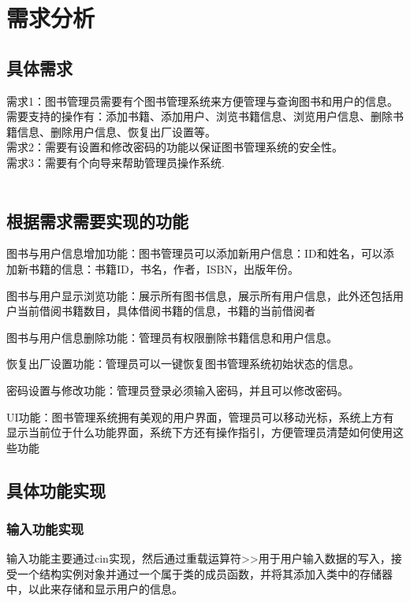 \documentclass{article}
\begin{document}
\tableofcontents
\newpage

\section{需求分析}

\subsection{具体需求}
\noindent
需求1：图书管理员需要有个图书管理系统来方便管理与查询图书和用户的信息。需要支持的操作有：添加书籍、添加用户、浏览书籍信息、浏览用户信息、删除书籍信息、删除用户信息、恢复出厂设置等。\\
需求2：需要有设置和修改密码的功能以保证图书管理系统的安全性。\\
需求3：需要有个向导来帮助管理员操作系统.\\\\

\subsection{根据需求需要实现的功能}
图书与用户信息增加功能：图书管理员可以添加新用户信息：ID和姓名，可以添加新书籍的信息：书籍ID，书名，作者，ISBN，出版年份。

图书与用户显示浏览功能：展示所有图书信息，展示所有用户信息，此外还包括用户当前借阅书籍数目，具体借阅书籍的信息，书籍的当前借阅者

图书与用户信息删除功能：管理员有权限删除书籍信息和用户信息。

恢复出厂设置功能：管理员可以一键恢复图书管理系统初始状态的信息。

密码设置与修改功能：管理员登录必须输入密码，并且可以修改密码。

UI功能：图书管理系统拥有美观的用户界面，管理员可以移动光标，系统上方有显示当前位于什么功能界面，系统下方还有操作指引，方便管理员清楚如何使用这些功能\\
\subsection{具体功能实现}
\subsubsection{输入功能实现}
输入功能主要通过cin实现，然后通过重载运算符\textgreater{}\textgreater{}用于用户输入数据的写入，接受一个结构实例对象并通过一个属于类的成员函数，并将其添加入类中的存储器中，以此来存储和显示用户的信息。\\
\end{document}
